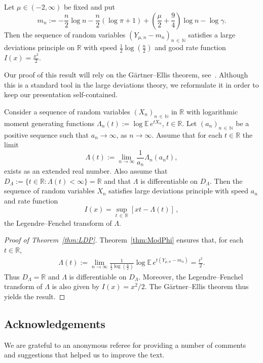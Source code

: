 \documentclass[AHL,Unicode,longabstracts,published]{cedram}
\newcommand{\R}{\mathbb{R}}
\newcommand{\N}{\mathbb{N}}
\newcommand{\EE}{\mathbb{E}\,}
\begin{document}
\begin{theo}\label{thm:LDP}
Let $\mu\in(-2,\infty)$ be fixed and put
\[
m_n:=-\frac{n}{2}\log n-\frac{n}{2}(\log\pi +1)+\left(\frac{\mu}{2}+\frac{9}{4}\right)\log n -\log\gamma.
\]
Then the sequence of random variables $(Y_{\mu,n}-m_n)_{n\,\in\,\N}$ satisfies a large deviations principle on $\R$ with speed $\frac{1}{2}\log(\frac{n}{2})$ and good rate function $I(x)=\frac{x^2}{2}$.
\end{theo}

Our proof of this result will rely on the G\"artner--Ellis theorem, see~\cite[Section~2.3]{DZ}. Although this is a standard tool in the large deviations theory, we reformulate it in order to keep our presentation self-contained.

\begin{lemm}
Consider a sequence of random variables $(X_n)_{n\,\in\,\mathbb{N}}$ in $\R$ with logarithmic moment generating functions $\Lambda_n(t):=\log\EE e^{tX_n}$, $t\in\R$. Let $(a_n)_{n\,\in\,\mathbb{N}}$ be a positive sequence such that $a_n\to\infty$, as $n\to\infty$. Assume that for each $t\in\R$ the limit
\[
\Lambda(t):=\lim_{n\rightarrow\infty}\frac{1}{a_n}\Lambda_n(a_nt),
\]
exists as an extended real number. Also assume that $D_\Lambda:=\{t\in\R:\Lambda(t)<\infty\}=\R$ and that $\Lambda$ is differentiable on $D_\Lambda$. Then the sequence of random variables $X_n$ satisfies large deviations principle with speed $a_n$ and rate function
\[
I(x)=\sup\limits_{t\,\in\,\R}[xt-\Lambda(t)]
\,,
\]
the Legendre--Fenchel transform of $\Lambda$.
\end{lemm}

\begin{proof}[Proof of Theorem~\ref{thm:LDP}]
Theorem~\ref{thm:ModPhi} ensures that, for each $t\in\R$,
\begin{align*}
\Lambda(t) := \lim_{n\rightarrow\infty}\frac{1}{\frac{1}{2}\log(\frac{n}{2})}\log\EE e^{t(Y_{\mu,n}-m_n)} = \frac{t^2}{2}.
\end{align*}
Thus $D_\Lambda=\R$ and $\Lambda$ is differentiable on $D_\Lambda$. Moreover, the Legendre--Fenchel transform of $\Lambda$ is also given by $I(x)=x^2/2$. The G\"artner--Ellis theorem thus yields the result.
\end{proof}

\subsection*{Acknowledgements}
We are grateful to an anonymous referee for providing a number of comments and suggestions that helped us to improve the text.



\end{document}
